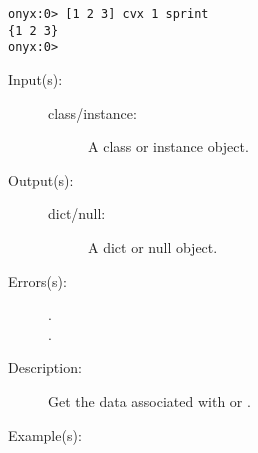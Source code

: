 \begin{description}
\begin{description}
\begin{verbatim}
onyx:0> [1 2 3] cvx 1 sprint
{1 2 3}
onyx:0>
		\end{verbatim}
	\end{description}
\label{systemdict:data}
\item[{\onyxop{class/instance}{data}{dict/null}}: ]
	\begin{description}\item[]
	\item[Input(s): ]
		\begin{description}\item[]
		\item[class/instance: ]
			A class or instance object.
		\end{description}
	\item[Output(s): ]
		\begin{description}\item[]
		\item[dict/null: ]
			A dict or null object.
		\end{description}
	\item[Errors(s): ]
		\begin{description}\item[]
		\item[.]
		\item[.]
		\end{description}
	\item[Description: ]
		Get the data associated with  or .
	\item[Example(s): ]\begin{verbatim}


\end{verbatim}
\end{description}
\end{description}
